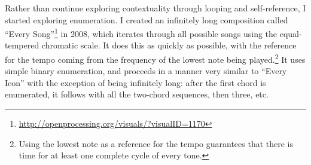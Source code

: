 \documentclass{thesis}
\begin{document}
Rather than continue exploring contextuality through looping and self-reference, I started exploring enumeration. I created an infinitely long composition called ``Every Song''\footnote{\url{http://openprocessing.org/visuals/?visualID=1170}} in 2008, which iterates through all possible songs using the equal-tempered chromatic scale. It does this as quickly as possible, with the reference for the tempo coming from the frequency of the lowest note being played.\footnote{Using the lowest note as a reference for the tempo guarantees that there is time for at least one complete cycle of every tone.} It uses simple binary enumeration, and proceeds in a manner very similar to ``Every Icon'' with the exception of being infinitely long: after the first chord is enumerated, it follows with all the two-chord sequences, then three, etc.
\end{document}
